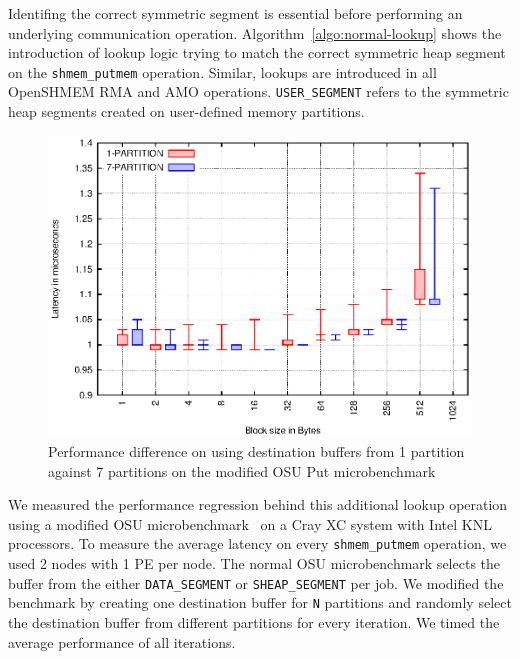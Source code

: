 Identifing the correct symmetric segment is essential before
performing an
underlying communication operation. %
Algorithm~\ref{algo:normal-lookup} shows the introduction of lookup
logic trying to match the correct symmetric heap segment on the
\texttt{shmem\_putmem} operation. Similar, lookups are introduced in
all OpenSHMEM RMA and AMO operations. \texttt{USER\_SEGMENT} refers to
the symmetric heap segments created on user-defined memory partitions.

\begin{figure}[h!]
    \vspace{-30pt}
    \centering
    \includegraphics[width=\linewidth]{graph/osu-put.eps}
    \caption{Performance difference on using destination buffers
    from 1 partition against 7 partitions on the modified OSU Put
    microbenchmark}
    \label{graph:lookup}
    \vspace{-20pt}
\end{figure}

We measured the performance regression behind this additional lookup
operation using a modified OSU microbenchmark~\cite{osu-mb}
on a Cray XC system with Intel KNL processors. To measure the average
latency on every \texttt{shmem\_putmem} operation, we used 2 nodes
with 1 PE per node.
The normal OSU microbenchmark selects the buffer from the either
\texttt{DATA\_SEGMENT} or \texttt{SHEAP\_SEGMENT}
per job. We modified the benchmark by creating
one destination buffer for \texttt{N} partitions and randomly select
the destination buffer from different partitions for every iteration.
We timed the average performance of all iterations.%

